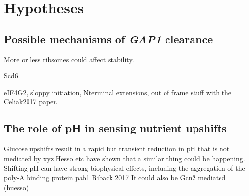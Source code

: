 \section{Hypotheses}

\subsection{Possible mechanisms of \textit{GAP1} clearance}

More or less ribsomes could affect stability.

Scd6

eIF4G2, sloppy initiation, Nterminal extensions, out of frame stuff
with the Celiak2017 paper.

\subsection{The role of pH in sensing nutrient upshifts}

Glucose upshifts result in a rapid but transient reduction in pH
that is not mediated by xyz
\parencite{kresnowati2008quantitative}
Hesso etc have shown that a similar thing could be happening.
Shifting pH can have strong biophysical effects, including
the aggregation of the poly-A binding protein pab1
Riback 2017
It could also be Gcn2 mediated (huesso)

